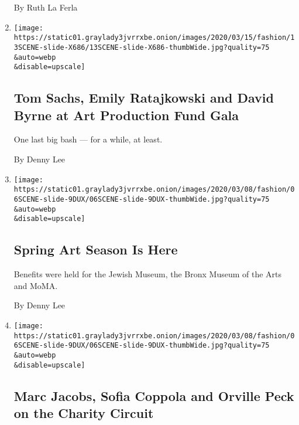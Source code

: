 \begin{enumerate}
  By Ruth La Ferla
\item
  \href{/slideshow/2020/03/13/fashion/tom-sachs-emily-ratajkowski-and-david-byrne-at-art-production-fund-gala.html}{}

  \texttt{[image: https://static01.graylady3jvrrxbe.onion/images/2020/03/15/fashion/13SCENE-slide-X686/13SCENE-slide-X686-thumbWide.jpg?quality=75\\\&auto=webp\\\&disable=upscale]}

  \hypertarget{tom-sachs-emily-ratajkowski-and-david-byrne-at-art-production-fund-gala}{%
  \subsection{Tom Sachs, Emily Ratajkowski and David Byrne at Art
  Production Fund
  Gala}\label{tom-sachs-emily-ratajkowski-and-david-byrne-at-art-production-fund-gala}}

  One last big bash --- for a while, at least.

  By Denny Lee
\item
  \href{/2020/03/06/style/spring-art-season-is-here.html}{}

  \texttt{[image: https://static01.graylady3jvrrxbe.onion/images/2020/03/08/fashion/06SCENE-slide-9DUX/06SCENE-slide-9DUX-thumbWide.jpg?quality=75\\\&auto=webp\\\&disable=upscale]}

  \hypertarget{spring-art-season-is-here}{%
  \subsection{Spring Art Season Is
  Here}\label{spring-art-season-is-here}}

  Benefits were held for the Jewish Museum, the Bronx Museum of the Arts
  and MoMA.

  By Denny Lee
\item
  \href{/slideshow/2020/03/06/fashion/marc-jacobs-sofia-coppola-and-orville-peck-on-the-charity-circuit.html}{}

  \texttt{[image: https://static01.graylady3jvrrxbe.onion/images/2020/03/08/fashion/06SCENE-slide-9DUX/06SCENE-slide-9DUX-thumbWide.jpg?quality=75\\\&auto=webp\\\&disable=upscale]}

  \hypertarget{marc-jacobs-sofia-coppola-and-orville-peck-on-the-charity-circuit}{%
  \subsection{Marc Jacobs, Sofia Coppola and Orville Peck on the Charity
  Circuit}\label{marc-jacobs-sofia-coppola-and-orville-peck-on-the-charity-circuit}}


\end{enumerate}
